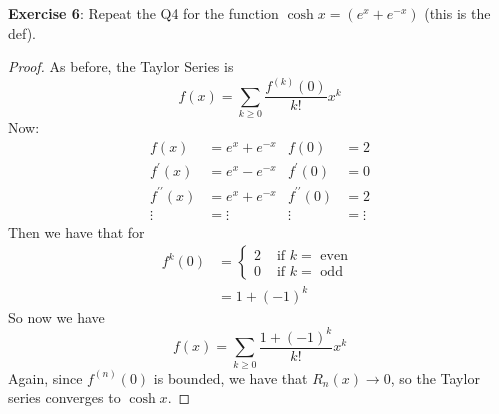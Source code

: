 \documentclass{article}
\begin{document}
\textbf{Exercise 6}: Repeat the Q4 for the function $\cosh{x} = (e^{x} + e^{-x})$ (this is the def).
    \begin{proof}
        As before, the Taylor Series is
            \begin{equation*}
                f(x) = \sum_{k \geq 0}\dfrac{f^{(k)}(0)}{k!}x^{k}
            \end{equation*}
        Now:
            \begin{align*}
                f(x)                &= e^{x} + e^{-x} & f(0)                &= 2      \\
                f^{\prime}(x)       &= e^{x} - e^{-x} & f^{\prime}(0)       &= 0      \\
                f^{\prime\prime}(x) &= e^{x} + e^{-x} & f^{\prime\prime}(0) &= 2      \\
                \vdots              &= \vdots         & \vdots              &= \vdots   
            \end{align*}
        Then we have that for
            \begin{align*}
                f^{k}(0) &= \begin{cases}
                    2                &\text{ if } k = \text{ even } \\
                    0 &\text{ if } k = \text{ odd }   
                \end{cases} \\
                      &= 1 + (-1)^{k}
            \end{align*}
        So now we have
            \begin{equation*}
                f(x) = \sum_{k \geq 0}\dfrac{1 + (-1)^{k}}{k!}x^{k}
            \end{equation*}
        Again, since $f^{(n)}(0)$ is bounded, we have that $R_{n}(x) \rightarrow 0$, so the Taylor series converges to $\cosh{x}$.
    \end{proof}
\end{document}
